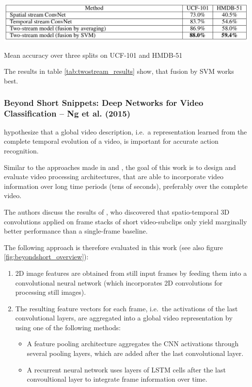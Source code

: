 \begin{table}[H]
    \centering
    \includegraphics[width=\textwidth]{img_deep/twostream_results}
    \caption{Mean accuracy over three splits on UCF-101 and HMDB-51 \cite{simonyan_two-stream_2014}}
    \label{tab:twostream_results}
\end{table}

The results in table \ref{tab:twostream_results} show, that fusion by SVM works best.


\subsubsection{Beyond Short Snippets: Deep Networks for Video Classification -- Ng et al. (2015)}

\textcite{ng_beyond_2015} hypothesize that a global video description, i.e.\ a representation learned from the complete temporal evolution of a video, is important for accurate action recognition.

Similar to the approaches made in \cite{baccouche_sequential_2011} and \cite{varol_long-term_2016}, the goal of this work is to design and evaluate video processing architectures, that are able to incorporate video information over long time periods (tens of seconds), preferably over the complete video.

The authors discuss the results of \textcite{karpathy_large-scale_2014}, who discovered that spatio-temporal 3D convolutions applied on frame stacks of short video-subclips only yield marginally better performance than a single-frame baseline.

The following approach is therefore evaluated in this work (see also figure \ref{fig:beyondshort_overview}):
\begin{enumerate}
    \item 2D image features are obtained from still input frames by feeding them into a convolutional neural network (which incorporates 2D convolutions for processing still images).
    \item The resulting feature vectors for each frame, i.e.\ the activations of the last convolutional layers, are aggregated into a global video representation by using one of the following methods:
    \begin{itemize}
        \item A feature pooling architecture aggregates the CNN activations through several pooling layers, which are added after the last convolutional layer.
        \item A recurrent neural network uses layers of LSTM cells after the last convoultional layer to integrate frame information over time.
    \end{itemize}
\end{enumerate}

